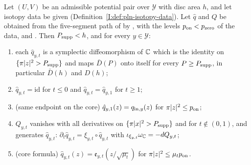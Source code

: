 \begin{theorem}\label{I:thm:pln-isotopy}
Let $(U,V)$ be an admissible potential pair over $\mathcal Y$ with disc area $h$, and let isotopy data be given
(Definition~\ref{I:def:pln-isotopy-data}). Let $\hat q$ and $Q$ be obtained from the five-segment path of
 by , with the levels $p_{\rm on}<p_{\rm zero}$ of the data,
and . Then $P_{\rm supp}<h$, and for every $y\in\mathcal Y$:
\begin{enumerate}[label=(\alph*)]
\item each $\hat q_{y,t}$ is a symplectic diffeomorphism of $\mathbb{C}$ which is the identity on $\{\pi|z|^2>P_{\rm supp}\}$ and maps
 $\bar D(P)$ onto itself for every $P\ge P_{\rm supp}$, in particular $\bar D(h)$ and $D(h)$;
\item $\hat q_{y,t}=\mathrm{id}$ for $t\le0$ and $\hat q_{y,t}=\hat q_{y,1}$ for $t\ge1$;
\item (same endpoint on the core) $\hat q_{y,1}(z)=q_{{\rm in},y}(z)$ for $\pi|z|^2\le p_{\rm on}$;
\item $Q_{y,t}$ vanishes with all derivatives on $\{\pi|x|^2>P_{\rm supp}\}$ and for $t\notin(0,1)$, and generates $\hat q_{y,t}$:
 $\partial_t\hat q_{y,t}=\xi_{y,t}\circ\hat q_{y,t}$ with $\iota_{\xi_{y,t}}\omega_{\mathbb{C}}=-dQ_{y,t}$;
\item (core formula) $\hat q_{y,t}(z)=\mathfrak e_{y,t}(z/\sqrt{\mu_t})$ for $\pi|z|^2\le\mu_tp_{\rm on}$.
\end{enumerate}
\end{theorem}

